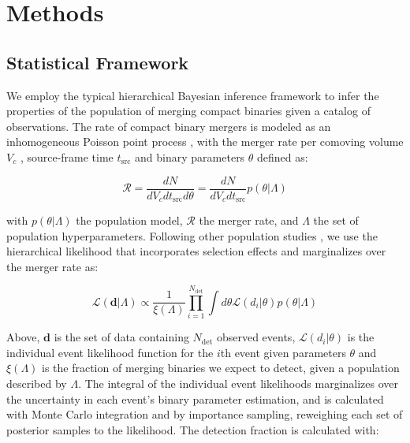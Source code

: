 \section{Methods} \label{sec:methods}

\subsection{Statistical Framework} \label{sec:statistical_framework}

We employ the typical hierarchical Bayesian inference framework to infer the properties of the population of merging compact binaries given a catalog of observations. The rate of compact binary mergers is modeled as an inhomogeneous Poisson point process \citep{10.1093/mnras/stz896}, with the merger rate per comoving volume $V_c$ \citep{astro-ph/9905116}, source-frame time $t_\text{src}$ and binary parameters $\theta$ defined as:

\begin{equation} \label{eq:rate}
    \mathcal{R} = \frac{dN}{dV_cdt_\mathrm{src}d\theta} = \frac{dN}{dV_cdt_\mathrm{src}} p(\theta | \Lambda)
\end{equation}

\noindent with $p(\theta | \Lambda)$ the population model, $\mathcal{R}$ the merger rate, and $\Lambda$ the set of population hyperparameters. Following other population studies \citep{10.1093/mnras/stz896,2021ApJ...913L...7A,2111.03634,2007.05579}, we use the hierarchical likelihood \citep{10.1063/1.1835214} that incorporates selection effects and marginalizes over the merger rate as: 

\begin{equation} \label{eq:likelihood}
    \mathcal{L}(\bm{d} | \Lambda) \propto \frac{1}{\xi(\Lambda)} \prod_{i=1}^{N_\mathrm{det}} \int d\theta \mathcal{L}(d_i | \theta) p(\theta | \Lambda)
\end{equation}

\noindent Above, $\bm{d}$ is the set of data containing $N_\mathrm{det}$ observed events, $\mathcal{L}(d_i | \theta)$ is the individual event likelihood function for the $i$th event given parameters $\theta$ and $\xi(\Lambda)$ is the fraction of merging binaries we expect to detect, given a population described by $\Lambda$. The integral of the individual event likelihoods marginalizes over the uncertainty in each event's binary parameter estimation, and is calculated with Monte Carlo integration and by importance sampling, reweighing each set of posterior samples to the likelihood. The detection fraction is calculated with:

